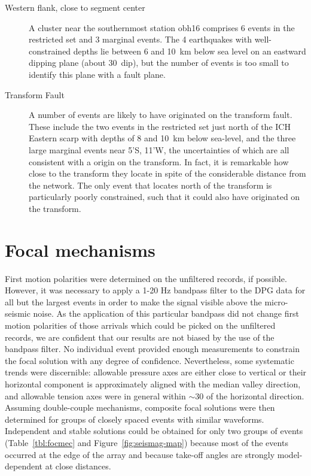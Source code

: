 \documentclass[jgr]{agu2001}
\newlength{\tw}
\begin{document}
\begin{article}
\begin{description}
\item[Western flank, close to segment center]
A cluster near the southernmost station obh16
comprises 6 events in the restricted set and 3 marginal events.
The 4 earthquakes with well-constrained depths lie between  6 and
10~km below sea level on an eastward
dipping plane (about 30\dg\ dip), but the number of events is too small to identify this
plane with a fault plane.

\item[Transform Fault]  A number of events are likely to have
originated on the transform fault.  These include the two events in the
restricted set just north of the ICH Eastern scarp with depths of
8 and 10~km below sea-level, and the three
large marginal events near 5'S, 11'W, the uncertainties of
which are all consistent with a origin on the transform. In fact, it
is remarkable how close to the transform they locate in spite of  the
considerable distance from the network.  The only event that locates  north of the transform is
particularly poorly constrained, such that it could also have
originated on the transform.  

\end{description}

\section{Focal mechanisms}

First motion polarities were determined on the unfiltered records, if
possible.  However, it was necessary to apply a 1-20 Hz bandpass
filter to the DPG data for
all but the largest events in order to make the signal visible above
the micro-seismic noise. As the application of this particular bandpass did not
change first motion polarities of those arrivals which could be picked on
the unfiltered records, we are confident that our results are not
biased by the use of the bandpass filter.  
No individual event provided enough measurements to constrain the
focal solution with any degree of confidence. Nevertheless, some
systematic trends were discernible:  allowable pressure
axes are either close to vertical or their horizontal component is approximately aligned with the
median valley direction, and allowable tension axes were in general within
$\sim$30{\dg} of the horizontal direction.  Assuming double-couple
mechanisms, composite focal solutions
were then determined for groups of closely spaced events with similar
waveforms.   Independent and stable solutions could be obtained for
only two groups of events (Table~\ref{tbl:focmec} and Figure~\ref{fig:seismag-map})
because most of the events occurred at the edge of the array and
because take-off angles are strongly
model-dependent at close distances.


\end{article}
\end{document}
